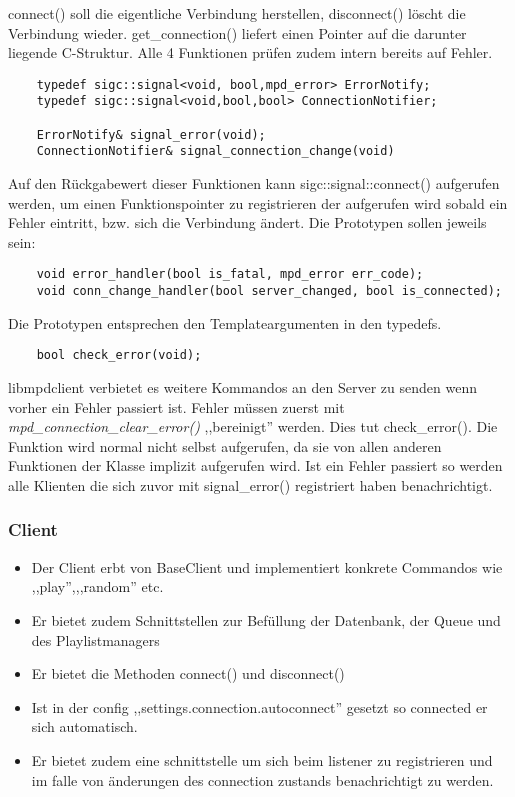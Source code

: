 connect() soll die eigentliche Verbindung herstellen, disconnect() löscht die Verbindung wieder.
get\_connection() liefert einen Pointer auf die darunter liegende C-Struktur. Alle 4 Funktionen prüfen 
zudem intern bereits auf Fehler.
\\

\begin{verbatim}
    typedef sigc::signal<void, bool,mpd_error> ErrorNotify;
    typedef sigc::signal<void,bool,bool> ConnectionNotifier;
    
    ErrorNotify& signal_error(void);
    ConnectionNotifier& signal_connection_change(void)
\end{verbatim}
Auf den Rückgabewert dieser Funktionen kann sigc::signal::connect() aufgerufen werden, 
um einen Funktionspointer zu registrieren der aufgerufen wird sobald ein Fehler eintritt,
bzw. sich die Verbindung ändert. Die Prototypen sollen jeweils sein:
\begin{verbatim}
    void error_handler(bool is_fatal, mpd_error err_code);
    void conn_change_handler(bool server_changed, bool is_connected); 
\end{verbatim} 
Die Prototypen entsprechen den Templateargumenten in den typedefs.

\begin{verbatim}
    bool check_error(void);
\end{verbatim}
libmpdclient verbietet es weitere Kommandos an den Server zu senden wenn vorher ein Fehler passiert ist.
Fehler müssen zuerst mit \emph{mpd\_connection\_clear\_error()} ,,bereinigt'' werden. 
Dies tut check\_error(). Die Funktion wird normal nicht selbst aufgerufen, da sie von allen anderen Funktionen der Klasse
implizit aufgerufen wird. Ist ein Fehler passiert so werden alle Klienten die sich zuvor
mit signal\_error() registriert haben benachrichtigt. 


\subsubsection{Client}
\begin{itemize}
    \item Der Client erbt von BaseClient und implementiert konkrete Commandos wie ,,play'',,,random'' etc.
    \item Er bietet zudem Schnittstellen zur Befüllung der Datenbank, der Queue und des Playlistmanagers
    \item Er bietet die Methoden connect() und disconnect() 
    \item Ist in der config ,,settings.connection.autoconnect'' gesetzt so connected er sich automatisch.
    \item Er bietet zudem eine schnittstelle um sich beim listener zu registrieren und im falle von 
        änderungen des connection zustands benachrichtigt zu werden.
\end{itemize}

